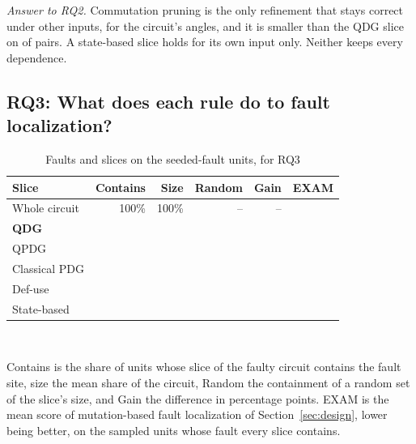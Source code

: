 \emph{Answer to RQ2.} Commutation pruning is the only refinement that stays correct under other inputs, for the
circuit's angles, and it is smaller than the QDG slice on \numLcqSmallerThanLc{} of \numLcqApplicable{} pairs. A
state-based slice holds for its own input only. Neither keeps every dependence.

\subsection{RQ3: What does each rule do to fault localization?}

\begin{table}[t]
  \centering
  \caption{Faults and slices on the \numRqThreeUnits{} seeded-fault units, for RQ3}
  \label{tab:rq3}
  \footnotesize\setlength{\tabcolsep}{3pt}\renewcommand{\arraystretch}{1.12}
  \newcommand{\sep}{\arrayrulecolor{black!25}\hline\arrayrulecolor{black}}
  \begin{tabular}{@{}l r r r r r@{}}
    \toprule
    \textbf{Slice} & \textbf{Contains} & \textbf{Size} & \textbf{Random} & \textbf{Gain} & \textbf{EXAM} \\
    \midrule
    Whole circuit & 100\% & 100\% & -- & -- & \numMbflAllExamAll{} \\
    \midrule
    \rowcolor{blue!7}\textbf{QDG} & \numRqThreeContainLc{} & \numRqThreeSizeLc{} & \numSizeCtlLcRandom{} & \numSizeCtlLcGain{} & \numMbflAllExamLc{} \\ \sep
    QPDG & \numRqThreeContainYz{} & \numRqThreeSizeYz{} & \numSizeCtlYzRandom{} & \numSizeCtlYzGain{} & \numMbflAllExamYz{} \\ \sep
    Classical PDG & \numRqThreeContainCpdg{} & \numRqThreeSizeCpdg{} & \numSizeCtlCpdgRandom{} & \numSizeCtlCpdgGain{} & \numMbflAllExamCpdg{} \\ \sep
    Def-use & \numRqThreeContainDu{} & \numRqThreeSizeDu{} & \numSizeCtlDuRandom{} & \numSizeCtlDuGain{} & \numMbflAllExamDu{} \\ \sep
    State-based & \numRqThreeContainQ{} & \numRqThreeSizeQ{} & \numSizeCtlQRandom{} & \numSizeCtlQGain{} & \numMbflAllExamQ{} \\
    \bottomrule
  \end{tabular}\\[3pt]
  \begin{minipage}{\columnwidth}\footnotesize
  Contains is the share of units whose slice of the faulty circuit contains the fault site, size the mean share of the
  circuit, Random the containment of a random set of the slice's size, and Gain the difference in percentage points.
  EXAM is the mean score of mutation-based fault localization of Section~\ref{sec:design}, lower being better, on
  the \numMbflAllN{} sampled units whose fault every slice contains.
  \end{minipage}
\end{table}

